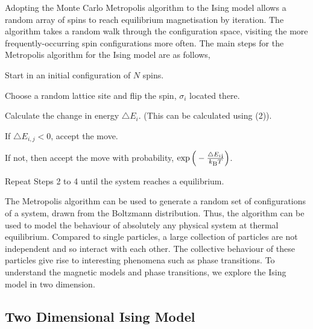 \documentclass[a4paper]{article}
\begin{document}

Adopting the Monte Carlo Metropolis algorithm to the Ising model \cite{7} allows a random array of spins to reach equilibrium magnetisation by iteration. The algorithm takes a random walk through the configuration space, visiting the more frequently-occurring spin configurations more often. The main steps for the Metropolis algorithm for the Ising model \cite{7} are as follows, 

\begin{description}[font=$\bullet$~\normalfont\scshape]
\item [Step 1] Start in an initial configuration of $N$ spins.
\item [Step 2] Choose a random lattice site and flip the spin, $\sigma_{i}$ located there.
\item [Step 3] Calculate the change in energy $\triangle{E_{i}}$. (This can be calculated using (2)).
\item [Step 4 (i)] If $\triangle{E_{i,j}} < 0$, accept the move.
\item [Step 4 (ii)] If not, then accept the move with probability, $\exp \Big( - \frac{\triangle{E_{i}}\textsubscript{i}}{k\textsubscript{B} T}\Big)$.
\item [Step 5] Repeat Steps 2 to 4 until the system reaches a equilibrium.
\end{description}

The Metropolis algorithm can be used to generate a random set of configurations of a system, drawn from the Boltzmann distribution. Thus, the algorithm can be used to model the behaviour of absolutely any physical system at thermal equilibrium. Compared to single particles, a large collection of particles are not independent and so interact with each other. The collective behaviour of these particles give rise to interesting phenomena such as phase transitions. To understand the magnetic models and phase transitions, we explore the Ising model in two dimension.

\subsection{Two Dimensional Ising Model}
\end{document}

